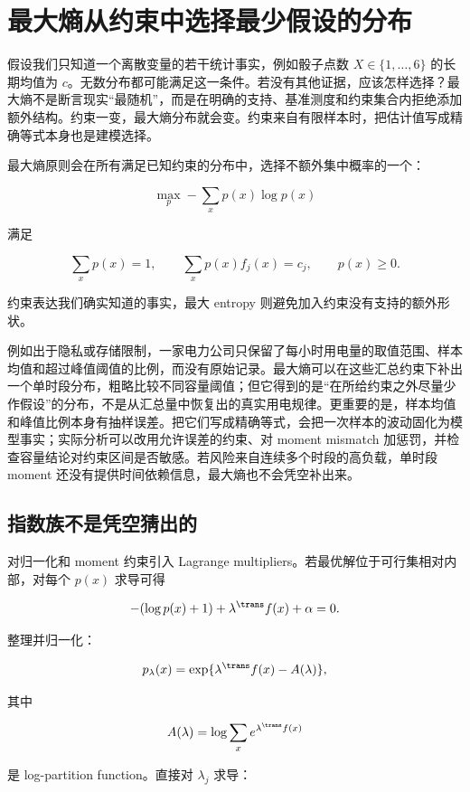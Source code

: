 \section{最大熵从约束中选择最少假设的分布}
\label{sec:13-Machine-Learning/11-Information-Theoretic-Learning/02}

假设我们只知道一个离散变量的若干统计事实，例如骰子点数 \(X\in\{1,\ldots,6\}\) 的长期均值为 \(c\)。无数分布都可能满足这一条件。若没有其他证据，应该怎样选择？最大熵不是断言现实``最随机''，而是在明确的支持、基准测度和约束集合内拒绝添加额外结构。约束一变，最大熵分布就会变。约束来自有限样本时，把估计值写成精确等式本身也是建模选择。

最大熵原则会在所有满足已知约束的分布中，选择不额外集中概率的一个：

\[
\max_p -\sum_xp(x)\log p(x)
\]

满足

\[
\sum_xp(x)=1,\qquad
\sum_xp(x)f_j(x)=c_j,\qquad
p(x)\ge0.
\]

约束表达我们确实知道的事实，最大 entropy 则避免加入约束没有支持的额外形状。

例如出于隐私或存储限制，一家电力公司只保留了每小时用电量的取值范围、样本均值和超过峰值阈值的比例，而没有原始记录。最大熵可以在这些汇总约束下补出一个单时段分布，粗略比较不同容量阈值；但它得到的是``在所给约束之外尽量少作假设''的分布，不是从汇总量中恢复出的真实用电规律。更重要的是，样本均值和峰值比例本身有抽样误差。把它们写成精确等式，会把一次样本的波动固化为模型事实；实际分析可以改用允许误差的约束、对 moment mismatch 加惩罚，并检查容量结论对约束区间是否敏感。若风险来自连续多个时段的高负载，单时段 moment 还没有提供时间依赖信息，最大熵也不会凭空补出来。

\subsection{指数族不是凭空猜出的}

对归一化和 moment 约束引入 Lagrange multipliers。若最优解位于可行集相对内部，对每个 \(p(x)\) 求导可得

\[
-(\log p(x)+1)
+\lambda^{\trans} f(x)+\alpha=0.
\]

整理并归一化：

\[
p_\lambda(x)
=\exp\{\lambda^{\trans} f(x)-A(\lambda)\},
\]

其中

\[
A(\lambda)
=\log\sum_xe^{\lambda^{\trans} f(x)}
\]

是 log-partition function。直接对 \(\lambda_j\) 求导：

